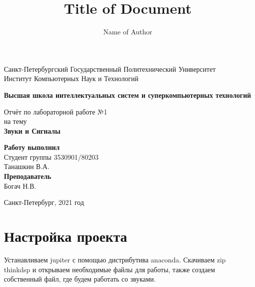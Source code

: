 \documentclass{article}
\title{Title of Document}
\author{Name of Author}\documentclass[10pt,a4paper,oneside]{article}
\begin{document}
\begin{titlepage}
\newpage
	\begin{center}
		\Large Санкт-Петербургский Государственный Политехнический Университет\\
		Институт Компьютерных Наук и Технологий\\
	\end{center}
	\begin{center}
		\large\textbf {Высшая школа интеллектуальных систем и суперкомпьютерных технологий}
	\end{center}
	
	\vspace{5em}
	\begin{center}
		\large{Отчёт по лабораторной работе №1 \\ на тему \\
		\textbf{Звуки и Сигналы} }
	\end{center}
	
	\vspace{25em}
	\begin{flushright}
		\textbf{Работу выполнил\\}Студент группы 3530901/80203 \\ Танашкин В.А.\\
		\textbf{Преподаватель\\}Богач Н.В. 
	\end{flushright}
	
	\vspace{\fill}%
	\begin{center}
	Санкт-Петербург, 2021 год	
	\end{center}
\end{titlepage} %

\section{Настройка проекта}
Устанавливаем jupiter с помощью дистрибутива anaconda. Скачиваем zip thinkdsp и открываем необходимые файлы для работы, также создаем собственный файл, где будем работать со звуками.
\end{document}
